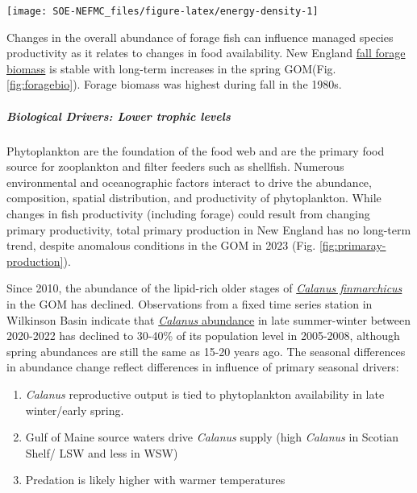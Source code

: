 \documentclass[
  10pt,
]{article}
\providecommand{\tightlist}{%
  \setlength{\itemsep}{0pt}\setlength{\parskip}{0pt}}
\let\origfigure\figure
\let\endorigfigure\endfigure
\renewenvironment{figure}[1][2] {
    \expandafter\origfigure\expandafter[H]
} {
    \endorigfigure
}
\begin{document}
\begin{figure}

{\centering \texttt{[image: SOE-NEFMC\_files/figure-latex/energy-density-1]} 

}

\caption{Forage fish energy density mean and standard deviation by season and year, compared with 1980s (solid line; Steimle and Terranove 1985) and 1990s (dashed line; Lawson et al. 1998) values.}\label{fig:energy-density}
\end{figure}

Changes in the overall abundance of forage fish can influence managed species productivity as it relates to changes in food availability. New England \href{https://noaa-edab.github.io/catalog/forage-fish-index.html}{fall forage biomass} is stable with long-term increases in the spring GOM(Fig. \ref{fig:foragebio}). Forage biomass was highest during fall in the 1980s.

\hypertarget{biological-drivers-lower-trophic-levels}{%
\subparagraph{Biological Drivers: Lower trophic levels}\label{biological-drivers-lower-trophic-levels}}

Phytoplankton are the foundation of the food web and are the primary food source for zooplankton and filter feeders such as shellfish. Numerous environmental and oceanographic factors interact to drive the abundance, composition, spatial distribution, and productivity of phytoplankton. While changes in fish productivity (including forage) could result from changing primary productivity, total primary production in New England has no long-term trend, despite anomalous conditions in the GOM in 2023 (Fig. \ref{fig:primaray-production}).

Since 2010, the abundance of the lipid-rich older stages of \href{https://noaa-edab.github.io/catalog/mesozooplankton-biomass-at-wilkson-basin.html}{\emph{Calanus finmarchicus}} in the GOM has declined. Observations from a fixed time series station in Wilkinson Basin indicate that \href{https://noaa-edab.github.io/catalog/seasonal-variation-of-calanus-finmarchicus.html}{\emph{Calanus} abundance} in late summer-winter between 2020-2022 has declined to 30-40\% of its population level in 2005-2008, although spring abundances are still the same as 15-20 years ago. The seasonal differences in abundance change reflect differences in influence of primary seasonal drivers:

\begin{enumerate}
\def\labelenumi{\arabic{enumi}.}
\tightlist
\item
  \emph{Calanus} reproductive output is tied to phytoplankton availability in late winter/early spring.
\item
  Gulf of Maine source waters drive \emph{Calanus} supply (high \emph{Calanus} in Scotian Shelf/ LSW and less in WSW)
\item
  Predation is likely higher with warmer temperatures
\end{enumerate}
\end{document}
